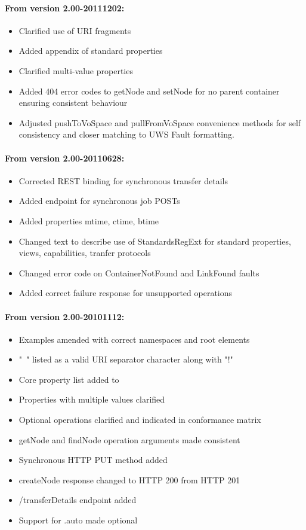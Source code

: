 \documentclass[11pt,a4paper]{ivoa}
\begin{document}
\paragraph{From version 2.00-20111202:}
\begin{itemize}
    \item Clarified use of URI fragments
    \item Added appendix of standard properties
    \item Clarified multi-value properties
    \item Added 404 error codes to getNode and setNode for no parent container ensuring consistent behaviour
    \item Adjusted pushToVoSpace and pullFromVoSpace convenience methods for self consistency and closer matching to UWS Fault formatting.
\end{itemize}

\paragraph{From version 2.00-20110628:}
\begin{itemize}
    \item Corrected REST binding for synchronous transfer details
    \item Added endpoint for synchronous job POSTs
    \item Added properties mtime, ctime, btime
    \item Changed text to describe use of StandardsRegExt for standard properties, views, capabilities, tranfer protocols
    \item Changed error code on ContainerNotFound and LinkFound faults
    \item Added correct failure response for unsupported operations
\end{itemize}

\paragraph{From version 2.00-20101112:}
\begin{itemize}
    \item Examples amended with correct namespaces and root elements
    \item "~" listed as a valid URI separator character along with "!"
    \item Core property list added to
    \item Properties with multiple values clarified
    \item Optional operations clarified and indicated in conformance matrix
    \item getNode and findNode operation arguments made consistent
    \item Synchronous HTTP PUT method added
    \item createNode response changed to HTTP 200 from HTTP 201
    \item /{transferDetails} endpoint added
    \item Support for .auto made optional
\end{itemize}
\end{document}
